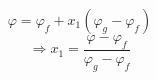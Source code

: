 

\item[c)]
    \begin{equation}
        \varphi = \varphi_f + x_1 \left( \varphi_g - \varphi_f \right)
    \end{equation}
    \begin{equation}
        \Rightarrow x_1 = \frac{\varphi - \varphi_f}{\varphi_g - \varphi_f}
    \end{equation}